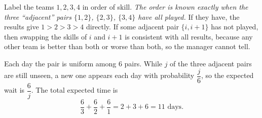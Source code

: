 Label the teams $1,2,3,4$ in order of skill. \emph{The order is known exactly when the three ``adjacent'' pairs $\{1,2\}$, $\{2,3\}$, $\{3,4\}$ have all played.} If they have, the results give $1>2>3>4$ directly. If some adjacent pair $\{i,i+1\}$ has not played, then swapping the skills of $i$ and $i+1$ is consistent with all results, because any other team is better than both or worse than both, so the manager cannot tell.

Each day the pair is uniform among $6$ pairs. While $j$ of the three adjacent pairs are still unseen, a new one appears each day with probability $\dfrac j6$, so the expected wait is $\dfrac6j$. The total expected time is
\[\dfrac63+\dfrac62+\dfrac61=2+3+6=\boxed{11}\text{ days}.\]
